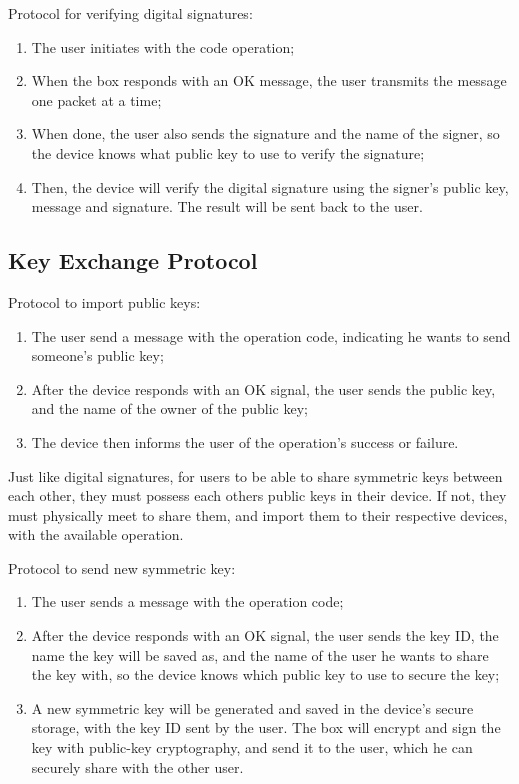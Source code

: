Protocol for verifying digital signatures:
\begin{enumerate}
    \item The user initiates with the code operation;
    \item When the box responds with an OK message, the user transmits the message one packet at a time;
    \item When done, the user also sends the signature and the name of the signer, so the device knows what public key to use to verify the signature;
    \item Then, the device will verify the digital signature using the signer's public key, message and signature. The result will be sent back to the user.
\end{enumerate}

\subsection{Key Exchange Protocol} \label{chap:arch:protocol:key}

Protocol to import public keys:
\begin{enumerate}
    \item The user send a message with the operation code, indicating he wants to send someone's public key;
    \item After the device responds with an OK signal, the user sends the public key, and the name of the owner of the public key;
    \item The device then informs the user of the operation's success or failure.
\end{enumerate}

Just like digital signatures, for users to be able to share symmetric keys between each other, they must possess each others public keys in their device. If not, they must physically meet to share them, and import them to their respective devices, with the available operation.

Protocol to send new symmetric key:
\begin{enumerate}
    \item The user sends a message with the operation code;
    \item After the device responds with an OK signal, the user sends the key ID, the name the key will be saved as, and the name of the user he wants to share the key with, so the device knows which public key to use to secure the key;
    \item A new symmetric key will be generated and saved in the device's secure storage, with the key ID sent by the user. The box will encrypt and sign the key with public-key cryptography, and send it to the user, which he can securely share with the other user.
\end{enumerate}

